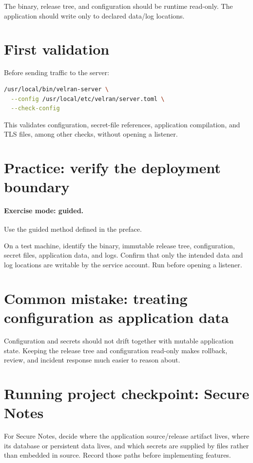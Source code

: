 The binary, release tree, and configuration should be runtime read-only. The application should write only to declared data/log locations.

\section{First validation}

Before sending traffic to the server:

\begin{lstlisting}[language=bash]
/usr/local/bin/velran-server \
  --config /usr/local/etc/velran/server.toml \
  --check-config
\end{lstlisting}

This validates configuration, secret-file references, application compilation, and TLS files, among other checks, without opening a listener.

\section{Practice: verify the deployment boundary}
\paragraph{Exercise mode: guided.} Use the guided method defined in the preface.

On a test machine, identify the binary, immutable release tree, configuration, secret files, application data, and logs. Confirm that only the intended data and log locations are writable by the service account. Run  before opening a listener.

\section{Common mistake: treating configuration as application data}
Configuration and secrets should not drift together with mutable application state. Keeping the release tree and configuration read-only makes rollback, review, and incident response much easier to reason about.

\section{Running project checkpoint: Secure Notes}
For Secure Notes, decide where the application source/release artifact lives, where its database or persistent data lives, and which secrets are supplied by files rather than embedded in source. Record those paths before implementing features.
